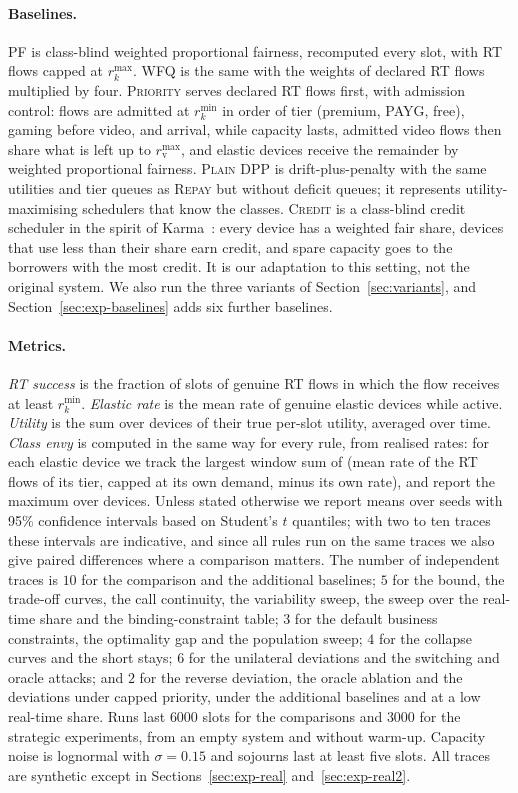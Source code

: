 \documentclass[preprint,11pt]{elsarticle}
\theoremstyle{definition}
\theoremstyle{remark}
\newcommand{\rmin}{r^{\min}}
\newcommand{\rmax}{r^{\max}}
\newcommand{\repay}{\textsc{Repay}}
\begin{document}
\paragraph{Baselines.}
\textsc{PF} is class-blind weighted proportional fairness, recomputed every slot, with RT flows capped at $\rmax_k$.
\textsc{WFQ} is the same with the weights of declared RT flows multiplied by four.
\textsc{Priority} serves declared RT flows first, with admission control: flows are admitted at $\rmin_k$ in order of tier (premium, PAYG, free), gaming before video, and arrival, while capacity lasts, admitted video flows then share what is left up to $\rmax_{\mathrm{v}}$, and elastic devices receive the remainder by weighted proportional fairness.
\textsc{Plain DPP} is drift-plus-penalty with the same utilities and tier queues as \repay{} but without deficit queues; it represents utility-maximising schedulers that know the classes.
\textsc{Credit} is a class-blind credit scheduler in the spirit of Karma~\citep{vuppalapati2023karma}: every device has a weighted fair share, devices that use less than their share earn credit, and spare capacity goes to the borrowers with the most credit. It is our adaptation to this setting, not the original system.
We also run the three variants of Section~\ref{sec:variants}, and Section~\ref{sec:exp-baselines} adds six further baselines.

\paragraph{Metrics.}
\emph{RT success} is the fraction of slots of genuine RT flows in which the flow receives at least $\rmin_k$.
\emph{Elastic rate} is the mean rate of genuine elastic devices while active.
\emph{Utility} is the sum over devices of their true per-slot utility, averaged over time.
\emph{Class envy} is computed in the same way for every rule, from realised rates: for each elastic device we track the largest window sum of (mean rate of the RT flows of its tier, capped at its own demand, minus its own rate), and report the maximum over devices.
Unless stated otherwise we report means over seeds with 95\% confidence intervals based on Student's $t$ quantiles; with two to ten traces these intervals are indicative, and since all rules run on the same traces we also give paired differences where a comparison matters.
The number of independent traces is $10$ for the comparison and the additional baselines; $5$ for the bound, the trade-off curves, the call continuity, the variability sweep, the sweep over the real-time share and the binding-constraint table; $3$ for the default business constraints, the optimality gap and the population sweep; $4$ for the collapse curves and the short stays; $6$ for the unilateral deviations and the switching and oracle attacks; and $2$ for the reverse deviation, the oracle ablation and the deviations under capped priority, under the additional baselines and at a low real-time share. Runs last $6000$ slots for the comparisons and $3000$ for the strategic experiments, from an empty system and without warm-up.
Capacity noise is lognormal with $\sigma=0.15$ and sojourns last at least five slots. All traces are synthetic except in Sections~\ref{sec:exp-real} and~\ref{sec:exp-real2}.
\end{document}
